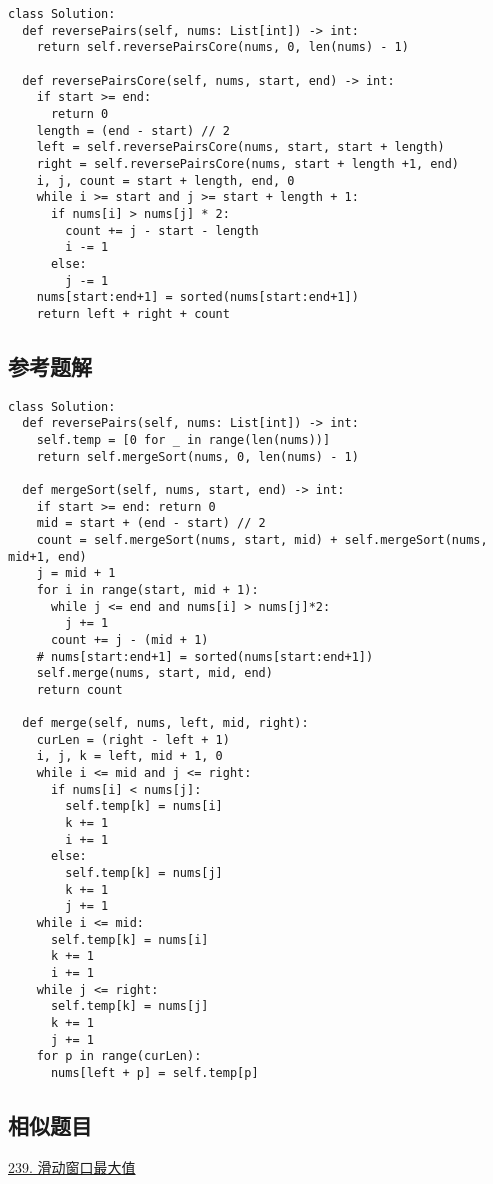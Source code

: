 \begin{verbatim}
class Solution:
  def reversePairs(self, nums: List[int]) -> int:
    return self.reversePairsCore(nums, 0, len(nums) - 1)

  def reversePairsCore(self, nums, start, end) -> int:
    if start >= end:
      return 0
    length = (end - start) // 2
    left = self.reversePairsCore(nums, start, start + length)
    right = self.reversePairsCore(nums, start + length +1, end)
    i, j, count = start + length, end, 0
    while i >= start and j >= start + length + 1:
      if nums[i] > nums[j] * 2:
        count += j - start - length
        i -= 1
      else:
        j -= 1
    nums[start:end+1] = sorted(nums[start:end+1])
    return left + right + count
\end{verbatim}

\subsection{参考题解}

\begin{verbatim}
class Solution:
  def reversePairs(self, nums: List[int]) -> int:
    self.temp = [0 for _ in range(len(nums))]
    return self.mergeSort(nums, 0, len(nums) - 1)

  def mergeSort(self, nums, start, end) -> int:
    if start >= end: return 0
    mid = start + (end - start) // 2
    count = self.mergeSort(nums, start, mid) + self.mergeSort(nums, mid+1, end)
    j = mid + 1
    for i in range(start, mid + 1):
      while j <= end and nums[i] > nums[j]*2:
        j += 1
      count += j - (mid + 1)
    # nums[start:end+1] = sorted(nums[start:end+1])
    self.merge(nums, start, mid, end)
    return count

  def merge(self, nums, left, mid, right):
    curLen = (right - left + 1)
    i, j, k = left, mid + 1, 0
    while i <= mid and j <= right:
      if nums[i] < nums[j]:
        self.temp[k] = nums[i]
        k += 1
        i += 1
      else:
        self.temp[k] = nums[j]
        k += 1
        j += 1
    while i <= mid:
      self.temp[k] = nums[i]
      k += 1
      i += 1
    while j <= right:
      self.temp[k] = nums[j]
      k += 1
      j += 1
    for p in range(curLen):
      nums[left + p] = self.temp[p]
\end{verbatim}

\subsection{相似题目}

\hyperref[leetcode:sw_51]{239. 滑动窗口最大值}
